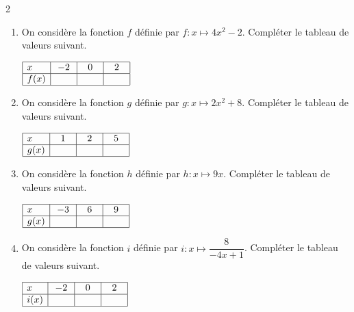 \documentclass[main.tex]{subfiles}
\begin{document}
\begin{exercise}\hfill 
	\begin{multicols}{2}
		\begin{enumerate}[leftmargin=*]
			\item On considère la fonction $f$ définie par $f:x\mapsto 4x^2-2$. Compléter le tableau de valeurs suivant.
			
			\medskip
			$\begin{array}{|l|c|c|c|}
				\hline
				x & -2 & 0 & 2 \\
				\hline
				f(x) & \phantom{-10} & \phantom{-10} & \phantom{-10} \\
				\hline
			\end{array}
			$
			\item On considère la fonction $g$ définie par $g:x\mapsto 2x^2+8$. Compléter le tableau de valeurs suivant.
			
			\medskip
			$\begin{array}{|l|c|c|c|}
				\hline
				x & 1 & 2 & 5 \\
				\hline
				g(x) & \phantom{-10} & \phantom{-10} & \phantom{-10} \\
				\hline
			\end{array}
			$
			\item On considère la fonction $h$ définie par $h:x\mapsto 9x$. Compléter le tableau de valeurs suivant.
			
			\medskip
			$\begin{array}{|l|c|c|c|}
				\hline
				x & -3 & 6 & 9 \\
				\hline
				g(x) & \phantom{-10} & \phantom{-10} & \phantom{-10} \\
				\hline
			\end{array}
			$ 
			\item On considère la fonction $i$ définie par $i:x\mapsto \dfrac{8}{-4x+1}$. Compléter le tableau de valeurs suivant.
			
			\medskip
			$\begin{array}{|l|c|c|c|}
				\hline
				x & -2 & 0 & 2 \\
				\hline
				i(x) & \phantom{-10} & \phantom{-10} & \phantom{-10} \\
				\hline
			\end{array}
			$
		\end{enumerate}
	\end{multicols}
\end{exercise}
\end{document}
